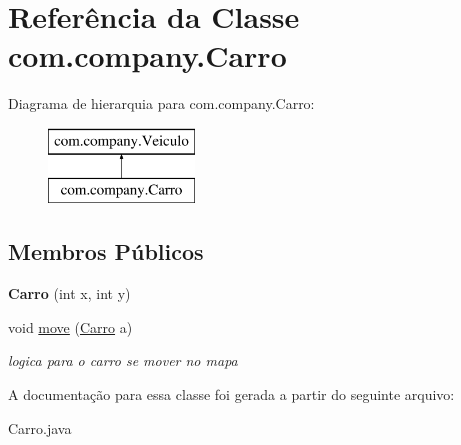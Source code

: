 \hypertarget{classcom_1_1company_1_1_carro}{}\section{Referência da Classe com.\+company.\+Carro}
\label{classcom_1_1company_1_1_carro}
Diagrama de hierarquia para com.\+company.\+Carro\+:\begin{figure}[H]
\begin{center}
\leavevmode
\includegraphics[height=2.000000cm]{classcom_1_1company_1_1_carro}
\end{center}
\end{figure}
\subsection*{Membros Públicos}
\begin{DoxyCompactItemize}
\item 
\mbox{\label{classcom_1_1company_1_1_carro_a37f52c32727826ff07e5daf63f9079ef}} 
{\bfseries Carro} (int x, int y)
\item 
\mbox{\label{classcom_1_1company_1_1_carro_aa768871c4c1c6514f123442ee55915f8}} 
void \mbox{\hyperlink{classcom_1_1company_1_1_carro_aa768871c4c1c6514f123442ee55915f8}{move}} (\mbox{\hyperlink{classcom_1_1company_1_1_carro}{Carro}} a)
\begin{DoxyCompactList}\small\item\em logica para o carro se mover no mapa \end{DoxyCompactList}\end{DoxyCompactItemize}


A documentação para essa classe foi gerada a partir do seguinte arquivo\+:\begin{DoxyCompactItemize}
\item 
Carro.\+java\end{DoxyCompactItemize}

